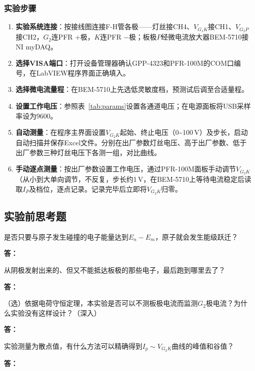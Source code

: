 \documentclass[dvipsnames, svgnames,a4paper,11pt]{article}
\newcommand{\answerblank}[1][3.8cm]{%
  \par\nopagebreak[4]\noindent\textbf{答：}\par\nopagebreak[4]\vspace*{#1}}
\begin{document}
\subsubsection{实验步骤}
\begin{enumerate}
	\item \textbf{实验系统连接}：按接线图连接F-H管各极——灯丝接CH4、$V_{G_1K}$接CH1、$V_{G_2P}$接CH2，$G_2$连PFR +极，$K$连PFR $-$极；板极$P$经微电流放大器BEM-5710接NI myDAQ。
	\item \textbf{选择VISA端口}：打开设备管理器确认GPP-4323和PFR-100M的COM口编号，在LabVIEW程序界面正确填入。
	\item \textbf{选择微电流量程}：在BEM-5710上先选低灵敏度档，预测试后调至合适量程。
	\item \textbf{设置工作电压}：参照表~\ref{tab:params}设置各通道电压；在电源面板将USB采样率设为9600。
	\item \textbf{自动测量}：在程序主界面设置$V_{G_2K}$起始、终止电压（0\textasciitilde100\,V）及步长，启动自动扫描并保存Excel文件。分别在出厂参数灯丝电压、高于出厂参数、低于出厂参数三种灯丝电压下各测一组，对比曲线。
	\item \textbf{手动逐点测量}：按出厂参数设置工作电压，通过PFR-100M面板手动调节$V_{G_2K}$（从小到大单向调节，不反复，步长约1\,V，在BEM-5710上等待电流稳定后读取$I_P$及档位，逐点记录。记录完毕后立即将$V_{G_2K}$归零。
\end{enumerate}


\subsection{实验前思考题}

\begin{question}
	是否只要与原子发生碰撞的电子能量达到$E_n-E_m$，原子就会发生能级跃迁？
\end{question}
\answerblank[3.8cm]

\begin{question}
	从阴极发射出来的、但又不能抵达板极的那些电子，最后跑到哪里去了？
\end{question}
\answerblank[3.8cm]

\begin{question}
	（选）依据电荷守恒定理，本实验是否可以不测板极电流而监测$G_2$极电流？为什么实验没有这样设计？（深入）
\end{question}
\answerblank[3.8cm]

\begin{question}
	实验测量为散点值，有什么方法可以精确得到$I_p\sim V_{G_2K}$曲线的峰值和谷值？
\end{question}
\answerblank[3.8cm]
\end{document}
